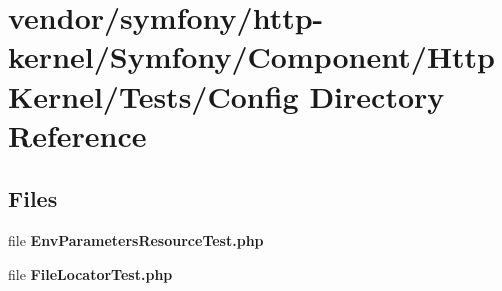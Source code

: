 \section{vendor/symfony/http-\/kernel/\+Symfony/\+Component/\+Http\+Kernel/\+Tests/\+Config Directory Reference}
\label{dir_ed1ce249f2e6e9322044e85e38617f63}
\subsection*{Files}
\begin{DoxyCompactItemize}
\item 
file {\bf Env\+Parameters\+Resource\+Test.\+php}
\item 
file {\bf File\+Locator\+Test.\+php}
\end{DoxyCompactItemize}
